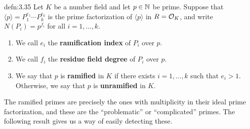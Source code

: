 \begin{defn}{defn:3.35}
    Let $K$ be a number field and let $p \in \mathbb{N}$ be prime. Suppose that 
    $\langle p \rangle = P_1^{e_1} \cdots P_k^{e_k}$ is the prime 
    factorization of $\langle p \rangle$ in $R = {\cal O}_K$, 
    and write $N(P_i) = p^{f_i}$ for all $i = 1, \dots, k$. 
    \begin{enumerate}[(1)]
        \item We call $e_i$ the {\bf ramification index} of $P_i$ over $p$.
        \item We call $f_i$ the {\bf residue field degree} of $P_i$ over $p$. 
        \item We say that $p$ is {\bf ramified} in $K$ if there exists 
        $i = 1, \dots, k$ such that $e_i > 1$. Otherwise, we say that $p$ 
        is {\bf unramified} in $K$. 
    \end{enumerate}
\end{defn}\vspace{-0.25cm}
The ramified primes are precisely the ones with multiplicity in their 
ideal prime factorization, and these are the ``problematic'' or 
``complicated'' primes. The following result gives us a way of 
easily detecting these. 

